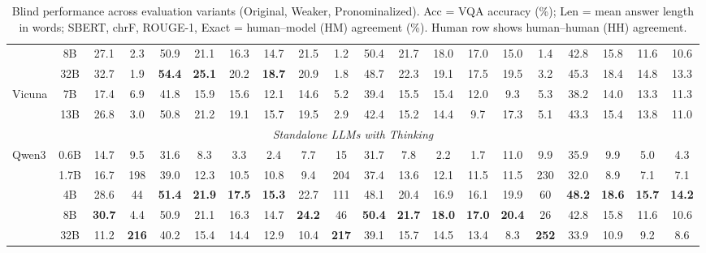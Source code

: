 \begin{table}[t]
{\begin{tabular}{lc|cccccc|cccccc|cccccc}
 & 8B & \cellcolor{gray!15}27.1 & 2.3 & 50.9 & 21.1 & 16.3 & 14.7 & \cellcolor{gray!15}21.5 & 1.2 & 50.4 & \cellcolor{gray!15}21.7 & 18.0 & \cellcolor{gray!15}17.0 & 15.0 & 1.4 & 42.8 & 15.8 & 11.6 & 10.6 \\
 & 32B & \cellcolor{gray!15}32.7 & 1.9 & \textbf{54.4} & \cellcolor{gray!15}\textbf{25.1} & \cellcolor{gray!15}20.2 & \cellcolor{gray!15}\textbf{18.7} & \cellcolor{gray!15}20.9 & 1.8 & 48.7 & \cellcolor{gray!15}22.3 & \cellcolor{gray!15}19.1 & \cellcolor{gray!15}17.5 & \cellcolor{gray!15}19.5 & 3.2 & 45.3 & 18.4 & 14.8 & 13.3 \\
\multirow{2}{*}{Vicuna} & 7B & 17.4 & 6.9 & 41.8 & 15.9 & 15.6 & 12.1 & 14.6 & 5.2 & 39.4 & 15.5 & 15.4 & 12.0 & 9.3 & 5.3 & 38.2 & 14.0 & 13.3 & 11.3 \\
 & 13B & \cellcolor{gray!15}26.8 & 3.0 & 50.8 & 21.2 & \cellcolor{gray!15}19.1 & 15.7 & \cellcolor{gray!15}19.5 & 2.9 & 42.4 & 15.2 & 14.4 & 9.7 & \cellcolor{gray!15}17.3 & 5.1 & 43.3 & 15.4 & 13.8 & 11.0 \\
\midrule
\multicolumn{20}{c}{\textit{Standalone LLMs with Thinking}} \\
\midrule
\multirow{5}{*}{Qwen3} & 0.6B & 14.7 & 9.5 & 31.6 & 8.3 & 3.3 & 2.4 & 7.7 & 15 & 31.7 & 7.8 & 2.2 & 1.7 & 11.0 & 9.9 & 35.9 & 9.9 & 5.0 & 4.3 \\
 & 1.7B & 16.7 & 198 & 39.0 & 12.3 & 10.5 & 10.8 & 9.4 & 204 & 37.4 & 13.6 & 12.1 & 11.5 & 11.5 & 230 & 32.0 & 8.9 & 7.1 & 7.1 \\
 & 4B & \cellcolor{gray!15}28.6 & 44 & \textbf{51.4} & \textbf{21.9} & \textbf{17.5} & \textbf{15.3} & \cellcolor{gray!15}22.7 & 111 & 48.1 & 20.4 & 16.9 & 16.1 & \cellcolor{gray!15}19.9 & 60 & \textbf{48.2} & \textbf{18.6} & \textbf{15.7} & \textbf{14.2} \\
 & 8B & \cellcolor{gray!15}\textbf{30.7} & 4.4 & 50.9 & 21.1 & 16.3 & 14.7 & \cellcolor{gray!15}\textbf{24.2} & 46 & \textbf{50.4} & \cellcolor{gray!15}\textbf{21.7} & \textbf{18.0} & \cellcolor{gray!15}\textbf{17.0} & \cellcolor{gray!15}\textbf{20.4} & 26 & 42.8 & 15.8 & 11.6 & 10.6 \\
 & 32B & 11.2 & \textbf{216} & 40.2 & 15.4 & 14.4 & 12.9 & 10.4 & \textbf{217} & 39.1 & 15.7 & 14.5 & 13.4 & 8.3 & \textbf{252} & 33.9 & 10.9 & 9.2 & 8.6 \\
\bottomrule
\end{tabular}
}
\caption{\small Blind performance across evaluation variants (Original, Weaker, Pronominalized). Acc = VQA accuracy (\%); Len = mean answer length in words; SBERT, chrF, ROUGE-1, Exact = human--model (HM) agreement (\%). Human row shows human--human (HH) agreement.}
\label{tab:comprehensive_inst_blind}
\end{table}
